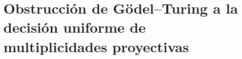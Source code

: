 \chapter{Obstrucción de Gödel--Turing a la decisión uniforme de multiplicidades proyectivas}
\label{chap:p3-final:54:godel_turing}

